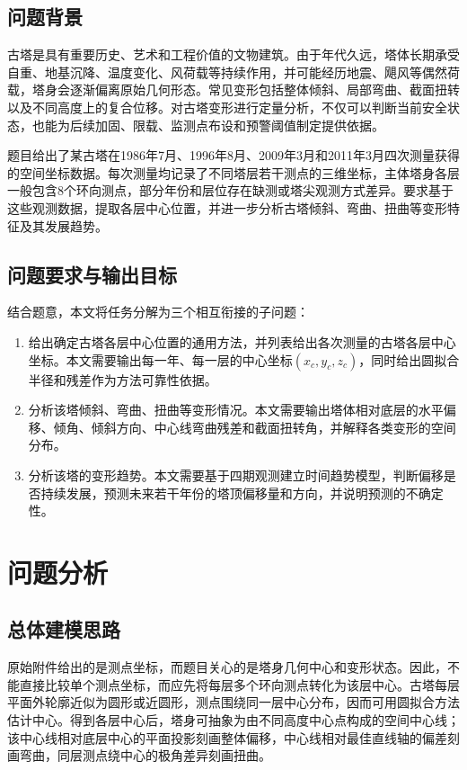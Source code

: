 \documentclass[UTF8,a4paper,12pt]{ctexart}
\begin{document}
\subsection{问题背景}
古塔是具有重要历史、艺术和工程价值的文物建筑。由于年代久远，塔体长期承受自重、地基沉降、温度变化、风荷载等持续作用，并可能经历地震、飓风等偶然荷载，塔身会逐渐偏离原始几何形态。常见变形包括整体倾斜、局部弯曲、截面扭转以及不同高度上的复合位移。对古塔变形进行定量分析，不仅可以判断当前安全状态，也能为后续加固、限载、监测点布设和预警阈值制定提供依据。

题目给出了某古塔在1986年7月、1996年8月、2009年3月和2011年3月四次测量获得的空间坐标数据。每次测量均记录了不同塔层若干测点的三维坐标，主体塔身各层一般包含8个环向测点，部分年份和层位存在缺测或塔尖观测方式差异。要求基于这些观测数据，提取各层中心位置，并进一步分析古塔倾斜、弯曲、扭曲等变形特征及其发展趋势。

\subsection{问题要求与输出目标}
结合题意，本文将任务分解为三个相互衔接的子问题：
\begin{enumerate}[label=\textbf{问题\arabic*：}]
    \item 给出确定古塔各层中心位置的通用方法，并列表给出各次测量的古塔各层中心坐标。本文需要输出每一年、每一层的中心坐标$(x_c,y_c,z_c)$，同时给出圆拟合半径和残差作为方法可靠性依据。
    \item 分析该塔倾斜、弯曲、扭曲等变形情况。本文需要输出塔体相对底层的水平偏移、倾角、倾斜方向、中心线弯曲残差和截面扭转角，并解释各类变形的空间分布。
    \item 分析该塔的变形趋势。本文需要基于四期观测建立时间趋势模型，判断偏移是否持续发展，预测未来若干年份的塔顶偏移量和方向，并说明预测的不确定性。
\end{enumerate}

\section{问题分析}
\subsection{总体建模思路}
原始附件给出的是测点坐标，而题目关心的是塔身几何中心和变形状态。因此，不能直接比较单个测点坐标，而应先将每层多个环向测点转化为该层中心。古塔每层平面外轮廓近似为圆形或近圆形，测点围绕同一层中心分布，因而可用圆拟合方法估计中心。得到各层中心后，塔身可抽象为由不同高度中心点构成的空间中心线；该中心线相对底层中心的平面投影刻画整体偏移，中心线相对最佳直线轴的偏差刻画弯曲，同层测点绕中心的极角差异刻画扭曲。
\end{document}
